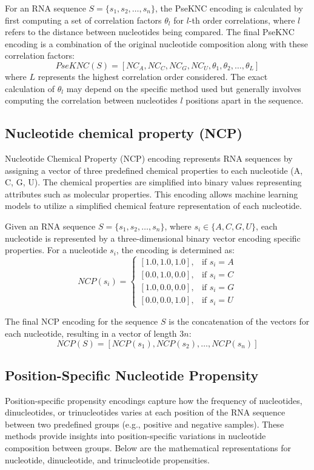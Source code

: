       For an RNA sequence $S = \{s_1, s_2, \dots, s_n\}$, the PseKNC encoding is calculated by first computing a set of correlation factors $\theta_l$ for $l$-th order correlations, where $l$ refers to the distance between nucleotides being compared. The final PseKNC encoding is a combination of the original nucleotide composition along with these correlation factors:
      \[
        PseKNC(S) = [NC_A, NC_C, NC_G, NC_U, \theta_1, \theta_2, \dots, \theta_L]
      \]
      where $L$ represents the highest correlation order considered.
      The exact calculation of $\theta_l$ may depend on the specific method used but generally involves computing the correlation between nucleotides $l$ positions apart in the sequence.

  \subsection{Nucleotide chemical property (NCP)}\label{subsec:ncp}
    Nucleotide Chemical Property (NCP) encoding represents RNA sequences by assigning a vector of three predefined chemical properties to each nucleotide (A, C, G, U). The chemical properties are simplified into binary values representing attributes such as molecular properties. This encoding allows machine learning models to utilize a simplified chemical feature representation of each nucleotide.

    Given an RNA sequence $S = \{s_1, s_2, \dots, s_n\}$, where $s_i \in \{A, C, G, U\}$, each nucleotide is represented by a three-dimensional binary vector encoding specific properties. For a nucleotide $s_i$, the encoding is determined as:
    \[
      NCP(s_i) = \begin{cases}
      [1.0, 1.0, 1.0]
                   , & \text{if } s_i = A \\
                   [0.0, 1.0, 0.0], & \text{if } s_i = C \\
                   [1.0, 0.0, 0.0], & \text{if } s_i = G \\
                   [0.0, 0.0, 1.0], & \text{if } s_i = U
      \end{cases}
    \]

    The final NCP encoding for the sequence $S$ is the concatenation of the vectors for each nucleotide, resulting in a vector of length $3n$:
    \[
      NCP(S) = [NCP(s_1), NCP(s_2), \dots, NCP(s_n)]
    \]

  \subsection{Position-Specific Nucleotide Propensity}\label{subsec:position-specific-nucleotide-propensity}
    Position-specific propensity encodings capture how the frequency of nucleotides, dinucleotides, or trinucleotides varies at each position of the RNA sequence between two predefined groups (e.g., positive and negative samples). These methods provide insights into position-specific variations in nucleotide composition between groups. Below are the mathematical representations for nucleotide, dinucleotide, and trinucleotide propensities.

